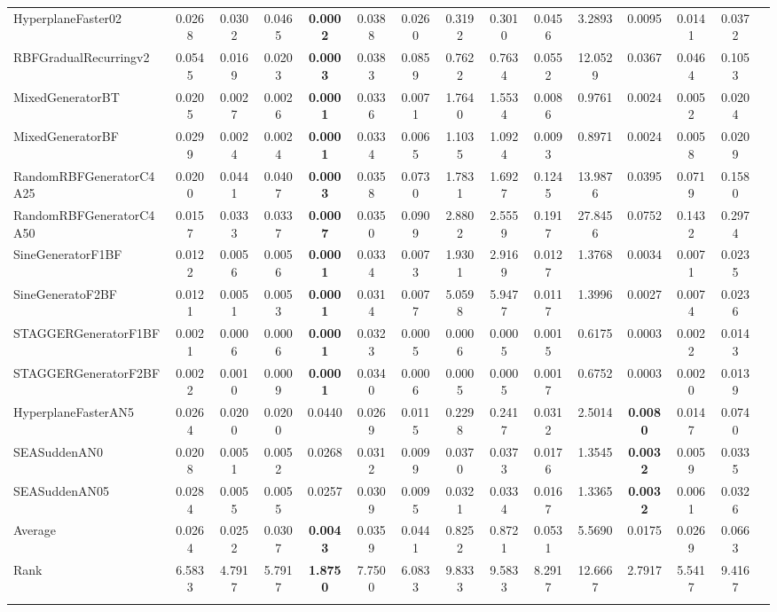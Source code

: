 \documentclass[reqno]{vcuthesis}
\numberwithin{equation}{chapter}
\begin{document}
\begin{table}[b!]
{\begin{tabularx}{1.45\textwidth}{l@{\extracolsep{\fill}}cccccccccccccc}
HyperplaneFaster02 &0.0268 &0.0302 &0.0465 &\textbf{0.0002} &0.0388 &0.0260 &0.3192 &0.3010 &0.0456 &3.2893 &0.0095 &0.0141 &0.0372  \\
RBFGradualRecurringv2 &0.0545 &0.0169 &0.0203 &\textbf{0.0003} &0.0383 &0.0859 &0.7622 &0.7634 &0.0552 &12.0529 &0.0367 &0.0464 &0.1053  \\
MixedGeneratorBT &0.0205 &0.0027 &0.0026 &\textbf{0.0001} &0.0336 &0.0071 &1.7640 &1.5534 &0.0086 &0.9761 &0.0024 &0.0052 &0.0204   \\
MixedGeneratorBF &0.0299 &0.0024 &0.0024 &\textbf{0.0001} &0.0334 &0.0065 &1.1035 &1.0924 &0.0093 &0.8971 &0.0024 &0.0058 &0.0209   \\
RandomRBFGeneratorC4A25 &0.0200 &0.0441 &0.0407 &\textbf{0.0003} &0.0358 &0.0730 &1.7831 &1.6927 &0.1245 &13.9876 &0.0395 &0.0719 &0.1580   \\
RandomRBFGeneratorC4A50 &0.0157 &0.0333 &0.0337 &\textbf{0.0007} &0.0350 &0.0909 &2.8802 &2.5559 &0.1917 &27.8456 &0.0752 &0.1432 &0.2974   \\
SineGeneratorF1BF &0.0122 &0.0056 &0.0056 &\textbf{0.0001} &0.0334 &0.0073 &1.9301 &2.9169 &0.0127 &1.3768 &0.0034 &0.0071 &0.0235   \\
SineGeneratoF2BF &0.0121 &0.0051 &0.0053 &\textbf{0.0001} &0.0314 &0.0077 &5.0598 &5.9477 &0.0117 &1.3996 &0.0027 &0.0074 &0.0236   \\
STAGGERGeneratorF1BF &0.0021 &0.0006 &0.0006 &\textbf{0.0001} &0.0323 &0.0005 &0.0006 &0.0005 &0.0015 &0.6175 &0.0003 &0.0022 &0.0143   \\
STAGGERGeneratorF2BF &0.0022 &0.0010 &0.0009 &\textbf{0.0001} &0.0340 &0.0006 &0.0005 &0.0005 &0.0017 &0.6752 &0.0003 &0.0020 &0.0139   \\
HyperplaneFasterAN5 &0.0264 &0.0200 &0.0200 &0.0440 &0.0269 &0.0115 &0.2298 &0.2417 &0.0312 &2.5014 &\textbf{0.0080} &0.0147 &0.0740   \\
SEASuddenAN0 &0.0208 &0.0051 &0.0052 &0.0268 &0.0312 &0.0099 &0.0370 &0.0373 &0.0176 &1.3545 &\textbf{0.0032} &0.0059 &0.0335   \\
SEASuddenAN05 &0.0284 &0.0055 &0.0055 &0.0257 &0.0309 &0.0095 &0.0321 &0.0334 &0.0167 &1.3365 &\textbf{0.0032} &0.0061 &0.0326   \\
\noalign{\smallskip}\hline\noalign{\smallskip}
Average &0.0264 &0.0252 &0.0307 &\textbf{0.0043} &0.0359 &0.0441 &0.8252 &0.8721 &0.0531 &5.5690 &0.0175 &0.0269 &0.0663   \\
Rank &6.5833 &4.7917 &5.7917 &\textbf{1.8750} &7.7500 &6.0833 &9.8333 &9.5833 &8.2917 &12.6667 &2.7917 &5.5417 &9.4167   \\
\noalign{\smallskip}\hline\noalign{\smallskip}
\end{tabularx}}
\begin{minipage}{0.9\textwidth}
\centering
{}
\end{minipage}
\end{table}
\end{document}
